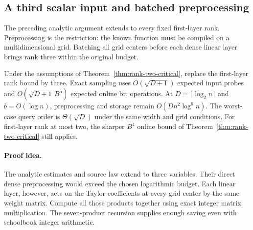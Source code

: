 \subsection{A third scalar input and batched preprocessing}
\label{sec:rank-three-critical}

The preceding analytic argument extends to every fixed first-layer
rank. Preprocessing is the restriction: the known function must be
compiled on a multidimensional grid. Batching all grid centers before
each dense linear layer brings rank three within the original budget.

\begin{theorem}
\label{thm:rank-three-critical}
Under the assumptions of Theorem~\ref{thm:rank-two-critical},
replace the first-layer rank bound by three. Exact sampling uses
$O(\sqrt{D+1})$ expected input probes and
$O(\sqrt{D+1}\,B^5)$ expected online bit operations.
At $D=\lceil\log_2n\rceil$ and $b=O(\log n)$, preprocessing
and storage remain $O(Dn^2\log^6n)$. The worst-case query order
is $\Theta(\sqrt D)$ under the same width and grid conditions.
For first-layer rank at most two, the sharper $B^4$ online bound
of Theorem~\ref{thm:rank-two-critical} still applies.
\end{theorem}

\paragraph{Proof idea.}
The analytic estimates and source law extend to three variables. Their
direct dense preprocessing would exceed the chosen logarithmic budget. Each
linear layer, however, acts on the Taylor coefficients at every grid center
by the same weight matrix. Compute all those products together using exact
integer matrix multiplication. The seven-product recursion supplies enough
saving even with schoolbook integer arithmetic.

